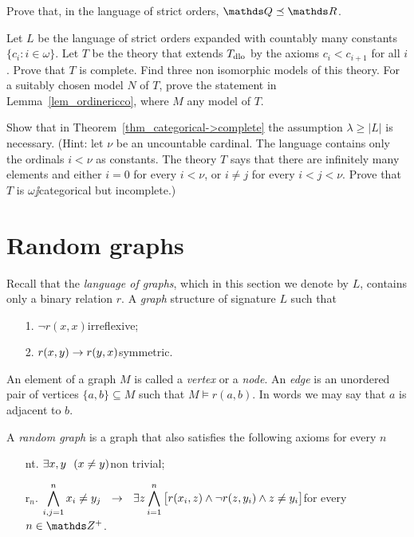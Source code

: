 \documentclass[creche.tex]{subfiles}
\begin{document}
\begin{exercise}
Prove that, in the language of strict orders, $\QQ\preceq\RR$.\QED
\end{exercise}

\begin{exercise}\label{VaughtEsempio3modelli}
Let $L$ be the language of strict orders expanded with countably many constants $\big\{c_i: i\in\omega\big\}$.
Let $T$ be the theory that extends $T_{\rm dlo}$ by the axioms $c_i<c_{i+1}$ for all $i$.
Prove that $T$ is complete.
Find three non isomorphic models of this theory.
For a suitably chosen model $N$ of $T$, prove the statement in Lemma~\ref{lem_ordinericco}, where $M$ any model of $T$.\QED
\end{exercise}


\begin{exercise}\label{categorica->completa}
Show that in Theorem~\ref{thm_categorical->complete} the assumption $\lambda\ge|L|$ is necessary.
(Hint: let $\nu$ be an uncountable cardinal.
The language contains only the ordinals $i<\nu$ as constants.
The theory $T$ says that there are infinitely many elements and either $i=0$ for every $i<\nu$, or $i\neq j$ for every $i<j<\nu$.
Prove that $T$ is $\omega\jj$categorical but incomplete.)\QED
\end{exercise}


\section{Random graphs}
\label{randomgraph}

Recall that the \emph{language of graphs}, which in this section we denote by $L$, contains only a binary relation $r$.
A \emph{graph\/} structure of signature $L$ such that

\begin{itemize}
\item[1.] $\neg r(x,x)$\hfill irreflexive;
\item[2.] $r(x,y)\rightarrow r(y,x)$\hfill symmetric.
\end{itemize}

An element of a graph $M$ is called a \emph{vertex\/} or a \emph{node}.
An \emph{edge\/} is an unordered pair of vertices $\{a,b\}\subseteq M$ such that $M\models r(a,b)$.
In words we may say that $a$ is adjacent to $b$.

A \emph{random graph\/} is a graph that also satisfies the following axioms for every $n$
\begin{itemize}
\item[nt.] $\exists x,y\ \ (x\neq y)$\hfill non trivial;
\item[r$_n$.] $\displaystyle\bigwedge^n_{i,j=1} x_i\neq y_j\ \ \imp\ \ \E z \bigwedge^n_{i=1} \big[r(x_i,z) \wedge \neg r(z,y_i) \wedge z\neq y_i\big]$\hfill for every $n\in\ZZ^+$.
\end{itemize}
\end{document}
